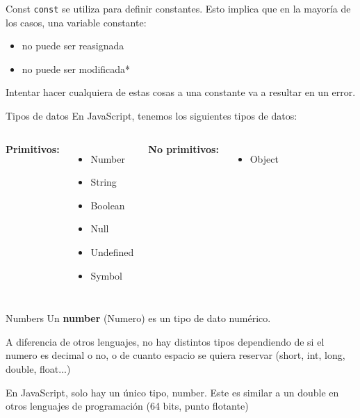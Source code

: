 \documentclass{beamer}
\begin{document}
\begin{frame}[fragile]{Const}
{\verb|const|} se utiliza para definir constantes. Esto implica que en la mayoría de los casos, una variable constante: \pause
\begin{itemize}
    \item no puede ser reasignada \pause
    \item no puede ser modificada* \pause
\end{itemize}

Intentar hacer cualquiera de estas cosas a una constante va a resultar en un error.
\end{frame}

\begin{frame}{Tipos de datos}
En JavaScript, tenemos los siguientes tipos de datos:\bigskip\pause

\begin{columns}[t, onlytextwidth]
                \textbf{Primitivos:}
                \begin{itemize}
                    \item Number
                    \item String
                    \item Boolean
                    \item Null
                    \item Undefined
                    \item Symbol
                \end{itemize} \pause
            
                \textbf{No primitivos:}
                \begin{itemize}
                    \item Object
                \end{itemize}
        \end{columns}
\end{frame}

\begin{frame}{Numbers}
Un \textbf{number} (Numero) es un tipo de dato numérico. \pause

A diferencia de otros lenguajes, no hay distintos tipos dependiendo de si el numero es decimal o no, o de cuanto espacio se quiera reservar (short, int, long, double, float...) \pause

En JavaScript, solo hay un único tipo, number. Este es similar a un double en otros lenguajes de programación (64 bits, punto flotante)
\end{frame}
\end{document}
